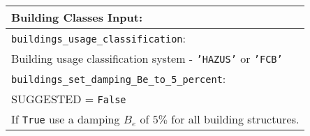 \vspace{2em}
\begin{tabular}{|p{\textwidth}|}
\hline
\vspace{0.3em} \noindent \Large \textbf{Building Classes Input:} \normalsize \\
\hline \vspace{0.1em} \texttt{buildings\_usage\_classification}: \\
Building usage classification system - \texttt{'HAZUS'} or \texttt{'FCB'} \\
\hline \vspace{0.1em}
\texttt{buildings\_set\_damping\_Be\_to\_5\_percent}: \\
SUGGESTED = \texttt{False} \\
If \texttt{True} use a damping $B_e$ of $5\%$ for all building structures.\\
\hline
 \end{tabular}

